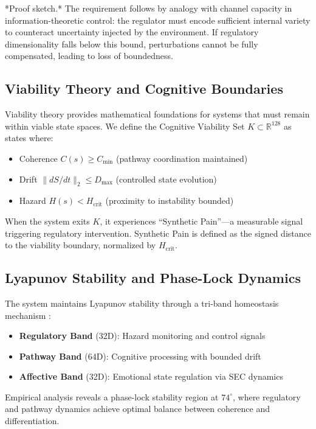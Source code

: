 \documentclass[12pt,a4paper]{report}
\begin{document}
*Proof sketch.* The requirement follows by analogy with channel capacity in information-theoretic control: the regulator must encode sufficient internal variety to counteract uncertainty injected by the environment. If regulatory dimensionality falls below this bound, perturbations cannot be fully compensated, leading to loss of boundedness.

\subsection{Viability Theory and Cognitive Boundaries}

Viability theory provides mathematical foundations for systems that must remain within viable state spaces. We define the Cognitive Viability Set $K \subset \mathbb{R}^{128}$ as states where:
\begin{itemize}
    \item Coherence $C(s) \geq C_{\min}$ (pathway coordination maintained)
    \item Drift $\lVert dS/dt \rVert_2 \leq D_{\max}$ (controlled state evolution)
    \item Hazard $H(s) < H_{\text{crit}}$ (proximity to instability bounded)
\end{itemize}

When the system exits $K$, it experiences ``Synthetic Pain''—a measurable signal
triggering regulatory intervention. Synthetic Pain is defined as the signed
distance to the viability boundary, normalized by $H_{\text{crit}}$.


\subsection{Lyapunov Stability and Phase-Lock Dynamics}

The system maintains Lyapunov stability through a tri-band homeostasis mechanism \citep{cannon1932wisdom}:
\begin{itemize}
    \item \textbf{Regulatory Band} (32D): Hazard monitoring and control signals
    \item \textbf{Pathway Band} (64D): Cognitive processing with bounded drift
    \item \textbf{Affective Band} (32D): Emotional state regulation via SEC dynamics
\end{itemize}

Empirical analysis reveals a phase-lock stability region at $74^\circ$, where regulatory and pathway dynamics achieve optimal balance between coherence and differentiation.
\end{document}
